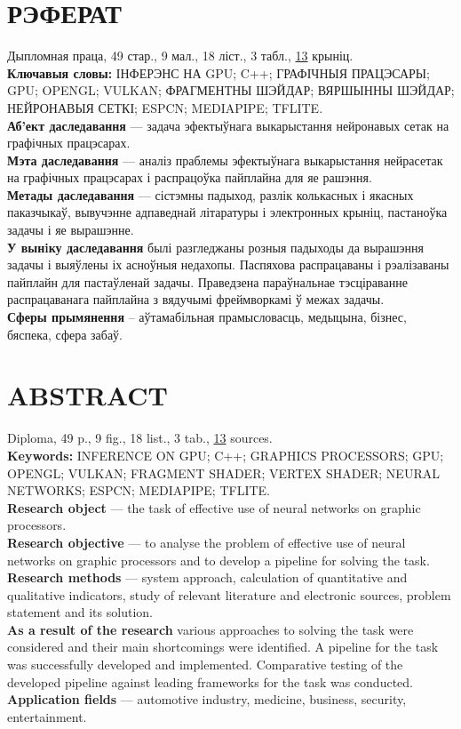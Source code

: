 \documentclass[a4paper,14pt]{extreport}
\begin{document}
    \chapter*{РЭФЕРАТ}
    Дыпломная праца, 49 стар., 9 мал., 18 ліст., 3 табл., \hyperlink{sources}{13} крыніц.\\
    \textbf{Ключавыя словы:} ІНФЕРЭНС НА GPU; C++; ГРАФІЧНЫЯ ПРАЦЭСАРЫ; GPU; OPENGL; VULKAN; ФРАГМЕНТНЫ ШЭЙДАР; ВЯРШЫННЫ ШЭЙДАР; НЕЙРОНАВЫЯ СЕТКІ; ESPCN; MEDIAPIPE; TFLITE.\\
    \textbf{Аб’ект даследавання} — задача эфектыўнага выкарыстання нейронавых сетак на графічных працэсарах.\\
    \textbf{Мэта даследавання} — аналіз праблемы эфектыўнага выкарыстання нейрасетак на графічных працэсарах і распрацоўка пайплайна для яе рашэння.\\
    \textbf{Метады даследавання} — сістэмны падыход, разлік колькасных і якасных паказчыкаў, вывучэнне адпаведнай літаратуры і электронных крыніц, пастаноўка задачы і яе вырашэнне.\\
    \textbf{У вынiку даследавання} былі разгледжаны розныя падыходы да вырашэння задачы і выяўлены іх асноўныя недахопы. Паспяхова распрацаваны і рэалізаваны пайплайн для пастаўленай задачы. Праведзена параўнальнае тэсціраванне распрацаванага пайплайна з вядучымі фреймворкамі ў межах задачы.\\
    \textbf{Сферы прымянення} – аўтамабільная прамысловасць, медыцына, бізнес, бяспека, сфера забаў.

    \chapter*{ABSTRACT}
    Diploma, 49 p., 9 fig., 18 list., 3 tab., \hyperlink{sources}{13} sources.\\
    \textbf{Keywords:} INFERENCE ON GPU; C++; GRAPHICS PROCESSORS; GPU; OPENGL; VULKAN; FRAGMENT SHADER; VERTEX SHADER; NEURAL NETWORKS; ESPCN; MEDIAPIPE; TFLITE.\\
    \textbf{Research object} — the task of effective use of neural networks on graphic
    processors.\\
    \textbf{Research objective} — to analyse the problem of effective use of neural networks on graphic processors and to develop a pipeline for solving the task.\\
    \textbf{Research methods} — system approach, calculation of quantitative and
    qualitative indicators, study of relevant literature and electronic sources, problem
    statement and its solution.\\
    \textbf{As a result of the research} various approaches to solving the task were
    considered and their main shortcomings were identified. A pipeline for the task
    was successfully developed and implemented. Comparative testing of the developed pipeline against leading frameworks for the task was conducted.\\
    \textbf{Application fields} — automotive industry, medicine, business, security, entertainment.
\end{document}
